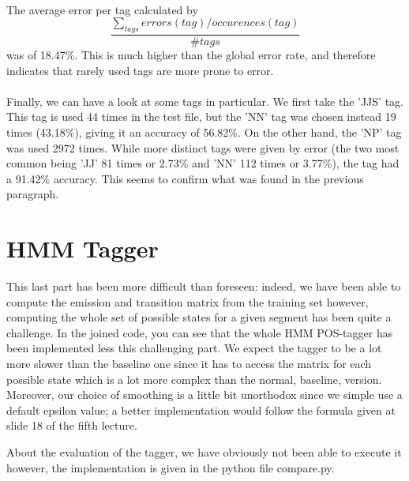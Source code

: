 \documentclass[10pt, a4paper, oneside]{article} %
\begin{document}
\paragraph*{} The average error per tag calculated by
$$ \frac{\sum_{tags}errors(tag)/occurences(tag)}{\# tags}$$
was of 18.47\%. This is much higher than the global error rate, and therefore indicates that rarely used tags are more prone to error.

\paragraph*{}Finally, we can have a look at some tags in particular. We first take the 'JJS' tag. This tag is used 44 times in the test file, but the 'NN' tag was chosen instead 19 times (43.18\%), giving it an accuracy of 56.82\%. On the other hand, the 'NP' tag was used 2972 times. While more distinct tags were given by error (the two most common being 'JJ' 81 times or 2.73\% and 'NN' 112 times or 3.77\%), the tag had a 91.42\% accuracy. This seems to confirm what was found in the previous paragraph.

\section{HMM Tagger}

This last part has been more difficult than foreseen: indeed, we have been able to compute the emission and transition matrix from the training set however, computing the whole set of possible states for a given segment has been quite a challenge. In the joined code, you can see that the whole HMM POS-tagger has been implemented less this challenging part. We expect the tagger to be a lot more slower than the baseline one since it has to access the matrix for each possible state which is a lot more complex than the normal, baseline, version. Moreover, our choice of smoothing is a little bit unorthodox since we simple use a default epsilon value; a better implementation would follow the formula given at slide 18 of the fifth lecture. 

About the evaluation of the tagger, we have obviously not been able to execute it however, the implementation is given in the python file compare.py. 


\pagestyle{fancy} %
\end{document}
